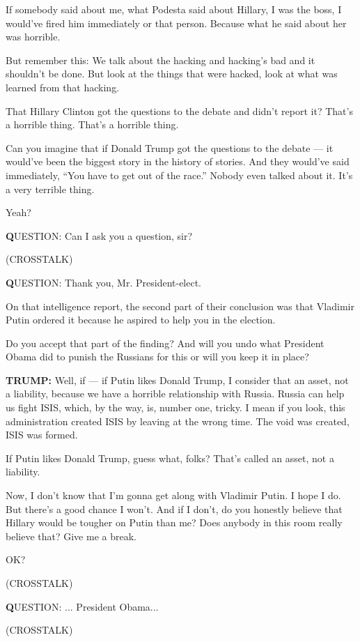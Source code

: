 If somebody said about me, what Podesta said about Hillary, I was the
boss, I would've fired him immediately or that person. Because what he
said about her was horrible.

But remember this: We talk about the hacking and hacking's bad and it
shouldn't be done. But look at the things that were hacked, look at what
was learned from that hacking.

That Hillary Clinton got the questions to the debate and didn't report
it? That's a horrible thing. That's a horrible thing.

Can you imagine that if Donald Trump got the questions to the debate ---
it would've been the biggest story in the history of stories. And they
would've said immediately, ``You have to get out of the race.'' Nobody
even talked about it. It's a very terrible thing.

Yeah?

\textbf{Q}UESTION: Can I ask you a question, sir?

(CROSSTALK)

\textbf{Q}UESTION: Thank you, Mr. President-elect.

On that intelligence report, the second part of their conclusion was
that Vladimir Putin ordered it because he aspired to help you in the
election.

Do you accept that part of the finding? And will you undo what President
Obama did to punish the Russians for this or will you keep it in place?

\textbf{TRUMP:} Well, if --- if Putin likes Donald Trump, I consider
that an asset, not a liability, because we have a horrible relationship
with Russia. Russia can help us fight ISIS, which, by the way, is,
number one, tricky. I mean if you look, this administration created ISIS
by leaving at the wrong time. The void was created, ISIS was formed.

If Putin likes Donald Trump, guess what, folks? That's called an asset,
not a liability.

Now, I don't know that I'm gonna get along with Vladimir Putin. I hope I
do. But there's a good chance I won't. And if I don't, do you honestly
believe that Hillary would be tougher on Putin than me? Does anybody in
this room really believe that? Give me a break.

OK?

(CROSSTALK)

\textbf{Q}UESTION: ... President Obama...

(CROSSTALK)

